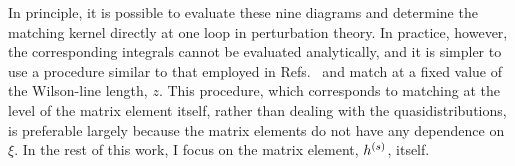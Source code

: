 In principle, it is possible to evaluate these nine diagrams and determine the matching kernel directly at one loop in perturbation theory. In practice, however, the corresponding integrals cannot be evaluated analytically, and it is simpler to use a procedure similar to that employed in Refs.~\cite{Ishikawa:2016znu,Constantinou:2017sej} and match at a fixed value of the Wilson-line length, $z$. This procedure, which corresponds to matching at the level of the matrix element itself, rather than dealing with the quasidistributions, is preferable largely because the matrix elements do not have any dependence on $\xi$. In the rest of this work, I focus on the matrix element, $h^{(s)}$, itself.
